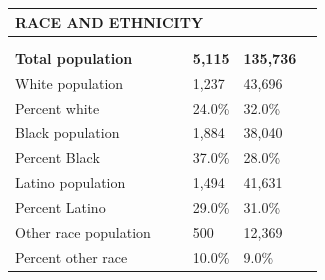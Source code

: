 \documentclass[9pt]{report}
\begin{document}
\vspace{12pt}
\setlength{\tabcolsep}{.01in} %
\begin{tabular}{p{.10in}p{.10in}p{.10in}p{3.7in}>{\hfill}p{.85in}>{\hfill}p{.85in}>{\hfill}p{.85in}>{\hfill}p{.85in}p{0.1in}}
\multicolumn{9}{l}{\parbox{7.1in}{\raggedright{\large{\strut\textbf{RACE AND ETHNICITY}\strut}}}} \\ 
\hline
\multicolumn{4}{l}{\parbox{3.5in}{\raggedright{\textbf{}}}} & \multicolumn{1}{r}{\parbox{.85in}{\strut\raggedleft{\textbf{}\strut}}} & \multicolumn{1}{r}{\parbox{.85in}{\strut\raggedleft{\textbf{}\strut}}} & \multicolumn{1}{r}{\parbox{.85in}{\strut{}}} & \multicolumn{1}{r}{\parbox{.85in}{\strut{}}} & \\ 
\multicolumn{9}{l}{} \\ 
\multicolumn{4}{l}{\parbox{3.5in}{\strut\raggedright{\textbf{Total population}\strut}}} & \textbf{} & \textbf{} & \textbf{5,115} & \textbf{135,736} & \textbf{} \\ 
\multicolumn{4}{l}{\parbox{3.6in}{\strut\raggedright{{White population}}\strut}} &  &  & 1,237 & 43,696 & \multicolumn{1}{l}{}  \\ 
\multicolumn{4}{l}{\parbox{3.6in}{\strut\raggedright{{Percent white}}\strut}} &  &  & 24.0\% & 32.0\% & \multicolumn{1}{l}{}  \\ 
\multicolumn{4}{l}{\parbox{3.6in}{\strut\raggedright{{Black population}}\strut}} &  &  & 1,884 & 38,040 & \multicolumn{1}{l}{}  \\ 
\multicolumn{4}{l}{\parbox{3.6in}{\strut\raggedright{{Percent Black}}\strut}} &  &  & 37.0\% & 28.0\% & \multicolumn{1}{l}{}  \\ 
\multicolumn{4}{l}{\parbox{3.6in}{\strut\raggedright{{Latino population}}\strut}} &  &  & 1,494 & 41,631 & \multicolumn{1}{l}{}  \\ 
\multicolumn{4}{l}{\parbox{3.6in}{\strut\raggedright{{Percent Latino}}\strut}} &  &  & 29.0\% & 31.0\% & \multicolumn{1}{l}{}  \\ 
\multicolumn{4}{l}{\parbox{3.6in}{\strut\raggedright{{Other race population}}\strut}} &  &  & 500 & 12,369 & \multicolumn{1}{l}{}  \\ 
\multicolumn{4}{l}{\parbox{3.6in}{\strut\raggedright{{Percent other race}}\strut}} &  &  & 10.0\% & 9.0\% & \multicolumn{1}{l}{}  \\ 

\end{tabular}
\setlength{\tabcolsep}{6pt} %
\end{document}
